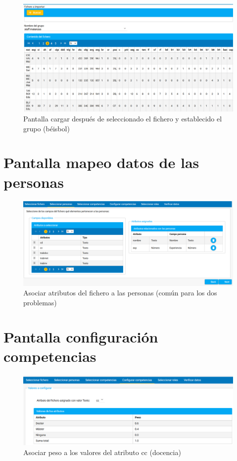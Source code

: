 {\begin{figure}[H]
	\centering
	\includegraphics[width=\textwidth]{figuras/cargar_fichero_beisbol.png}
	\caption{Pantalla cargar después de seleccionado el fichero y establecido el grupo (béisbol)} \label{fig:cargar-fichero-beisbol}
\end{figure}


\chapter{Pantalla mapeo datos de las personas}
\begin{figure}[H]
	\centering
	\includegraphics[width=\textwidth]{figuras/docencia_mapeo_atributos_personas.png}
	\caption{Asociar atributos del fichero a las personas (común para los dos problemas)} \label{fig:mapeo_atr_pers}
\end{figure}




\chapter{Pantalla configuración competencias}
\begin{figure}[H]
	\centering
	\includegraphics[width=\textwidth]{figuras/docencia_config_competencias_cc.png}
	\caption{Asociar peso a los valores del atributo cc (docencia)} \label{fig:conf_comp_cc_docencia}
\end{figure}

}
